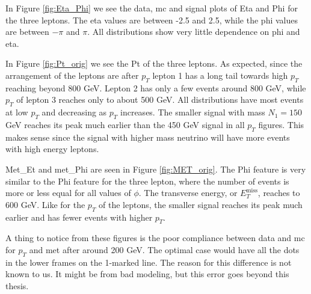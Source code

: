 \documentclass[a4paper, american, 12pt]{report}
\begin{document}
	In Figure \ref{fig:Eta_Phi} we see the data, \acrshort{mc} and signal plots of Eta and Phi for the three leptons. The eta values are between -2.5 and 2.5, while the phi values are between $-\pi$ and $\pi$. All distributions show very little dependence on phi and eta. 
	
	In Figure \ref{fig:Pt_orig} we see the Pt of the three leptons. As expected, since the arrangement of the leptons are after $p_T$ lepton 1 has a long tail towards high $p_T$ reaching beyond 800 GeV. Lepton 2 has only a few events around 800 GeV, while $p_T$ of lepton 3 reaches only to about 500 GeV. All distributions have most events at low $p_T$ and decreasing as $p_T$ increases. The smaller signal with mass $N_1=150$ GeV reaches its peak much earlier than the 450 GeV signal in all $p_T$ figures. This makes sense since the signal with higher mass neutrino will have more events with high energy leptons.
	
	Met\_Et and met\_Phi are seen in Figure \ref{fig:MET_orig}. The Phi feature is very similar to the Phi feature for the three lepton, where the number of events is more or less equal for all values of $\phi$. The transverse energy, or $E_T^{\text{miss}}$, reaches to 600 GeV. Like for the $p_T$ of the leptons, the smaller signal reaches its peak much earlier and has fewer events with higher $p_T$.
	
	A thing to notice from these figures is the poor compliance between data and \acrshort{mc} for $p_T$ and \acrshort{met} after around 200 GeV. The optimal case would have all the dots in the lower frames on the 1-marked line. The reason for this difference is not known to us. It might be from bad modeling, but this error goes beyond this thesis.
	
\end{document}
